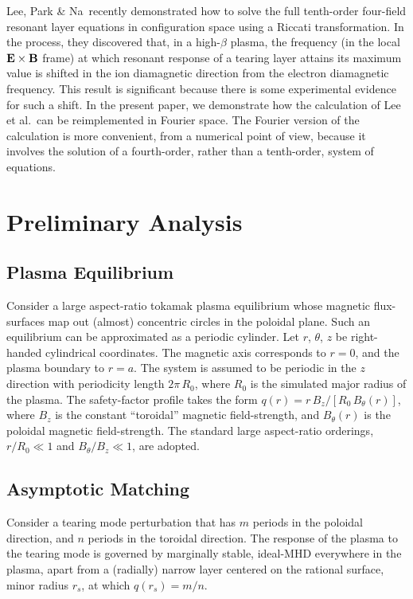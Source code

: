 \documentclass[12pt,prb,aps]{revtex4-1}
\begin{document}
 Lee, Park \& Na\,\cite{lee} recently demonstrated  how to solve the full tenth-order four-field resonant layer equations in configuration  space using a Riccati transformation. In the process, they discovered that, in a high-$\beta$ plasma,  the frequency (in the local ${\bf E}\times {\bf B}$ frame)  at which resonant response of
 a tearing layer attains its maximum value  is shifted in the ion diamagnetic direction from the electron diamagnetic frequency.
 This result is significant because there is some experimental evidence for such a shift.\cite{paz} In the present paper, we demonstrate how the calculation of
 Lee et al.\ can be reimplemented in Fourier space. The Fourier version of the calculation is more convenient, from a numerical point of view, because
 it involves the solution of a fourth-order, rather than a tenth-order, system of equations. 

\section{Preliminary Analysis}\label{sect1}
\subsection{Plasma Equilibrium}
Consider a large aspect-ratio tokamak plasma equilibrium whose magnetic flux-surfaces map out
(almost) concentric circles in the poloidal plane. Such an equilibrium can be approximated as a
periodic cylinder.\cite{rf1993} Let $r$, $\theta$, $z$ be right-handed cylindrical coordinates. 
The magnetic axis corresponds to $r=0$, and the plasma boundary to $r=a$. The system is assumed to be periodic in the $z$
direction with periodicity length $2\pi\,R_0$, where $R_0$ is the simulated major radius of the plasma. The
safety-factor profile takes the form $q(r)=r\,B_z/[R_0\,B_\theta(r)]$, where $B_z$ is the constant
``toroidal'' magnetic field-strength, and $B_\theta(r)$ is the poloidal magnetic field-strength. The standard
large aspect-ratio orderings, $r/R_0\ll 1$ and $B_\theta/B_z\ll 1$, are adopted. 

\subsection{Asymptotic Matching}\label{cyl}
Consider a tearing mode perturbation that has $m$ periods in the poloidal direction, and
$n$ periods in the toroidal direction. 
The response of the plasma to the tearing mode is
governed by marginally stable, ideal-MHD everywhere in the plasma, apart from a (radially) narrow
layer centered on the rational surface, minor radius $r_s$, at which $q(r_s)=m/n$.\cite{fkr}
\end{document}
